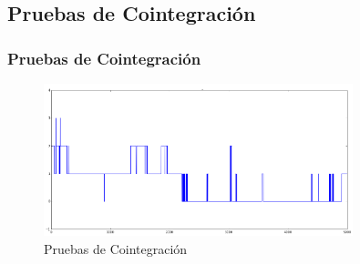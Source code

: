 \documentclass{beamer}
\begin{document}
        \subsection{Pruebas de Cointegración}
            \begin{frame}
            \frametitle{Pruebas de Cointegración}
            \begin{figure}[h!t]
                \begin{center}
                    \includegraphics[width=0.8\textwidth]{img/betas}
                    \caption{Pruebas de Cointegración}
                    \label{fig:cointegracion}
                \end{center}
            \end{figure}

            \end{frame}
\end{document}

